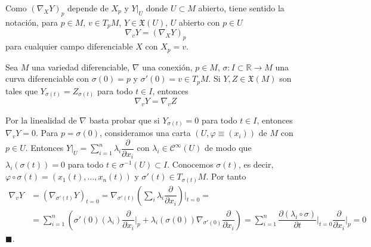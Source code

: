 \begin{notc}
    Como $(\nabla_XY)_p$ depende de $X_p$ y $Y|_U$ donde $U\subset M$ abierto, tiene sentido la notaci\'on, para $p\in M$, $v\in T_pM$, $Y \in \mathfrak X(U)$, $U$ abierto con $p\in U$
    $$\nabla_vY=(\nabla_X Y)_p$$
    para cualquier campo diferenciable $X$ con $X_p=v$.
\end{notc}

\begin{teo}
    Sea $M$ una variedad diferenciable, $\nabla$ una conexión, $p \in M$, $\sigma: I \subset \mathbb{R} \to M$ una curva diferenciable con $\sigma(0) = p$ y $\sigma'(0)=v \in T_pM$. Si $Y,Z \in \mathfrak X(M)$ son tales que $Y_{\sigma(t)} = Z_{\sigma(t)}$ para todo $t \in I$, entonces $$\nabla_v Y = \nabla_v Z$$
\end{teo}
\begin{dem}
    Por la linealidad de $\nabla$ basta probar que si $Y_{\sigma(t)} = 0$ para todo $t \in I$, entonces $\nabla_v Y = 0$.
    Para $p = \sigma(0)$, consideramos una carta $(U,\varphi\equiv (x_i))$ de $M$ con $p\in U$. Entonces $Y|_U = \sum_{i=1}^n \lambda_i \dfrac{\partial}{\partial x_i}$ con $\lambda_i \in \mathcal{C}^{\infty}(U)$ de modo que $\lambda_i(\sigma(t)) = 0$ para todo $t \in \sigma^{-1}(U) \subset I$. Conocemos $\sigma(t)$, es decir, $\varphi \circ \sigma(t) = (x_1(t),\dots,x_n(t))$ y $\sigma'(t) \in T_{\sigma(t)}M$. Por tanto
    \[ \begin{split}\nabla_v Y & = (\nabla_{\sigma'(t)} Y)_{t=0} = \nabla_{\sigma'(t)}\left(\sum_{i} \lambda_i \dfrac{\partial}{\partial x_i} \right)\Big|_{t=0}= \\ & =\sum_{i=1}^n \left( \sigma'(0)(\lambda_i) \dfrac{\partial}{\partial x_i}\Big|_p + \lambda_i(\sigma(0)) \nabla_{\sigma'(0)}\dfrac{\partial}{ \partial x_i} \right) = \sum_{i=1}^n \dfrac{\partial (\lambda_i \circ \sigma)}{\partial t}\Big|_{t=0} \dfrac{\partial}{\partial x_i}\Big|_p = 0 \end{split} \] 
    \hfill $\blacksquare.$
\end{dem}

